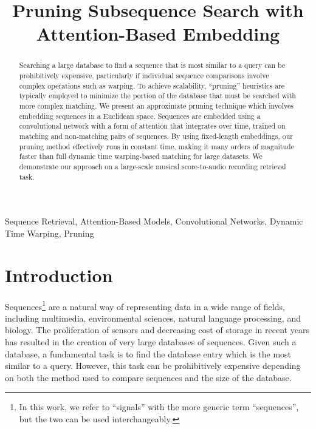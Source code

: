 \documentclass{article}
\title{Pruning Subsequence Search with Attention-Based Embedding}
\begin{document}
\ninept
\maketitle

\begin{abstract}
Searching a large database to find a sequence that is most similar to a query can be prohibitively expensive, particularly if individual sequence comparisons involve complex operations such as warping. 
To achieve scalability, ``pruning'' heuristics are typically employed to minimize the portion of the database that must be searched with more complex matching. 
We present an approximate pruning technique which involves embedding sequences in a Euclidean space.
Sequences are embedded using a convolutional network with a form of attention that integrates over time, trained on matching and non-matching pairs of sequences.
By using fixed-length embeddings, our pruning method effectively runs in constant time, making it many orders of magnitude faster than full dynamic time warping-based matching for large datasets.
We demonstrate our approach on a large-scale musical score-to-audio recording retrieval task.
\end{abstract}

\begin{keywords}
Sequence Retrieval, Attention-Based Models, Convolutional Networks, Dynamic Time Warping, Pruning
\end{keywords}

\section{Introduction}
\label{sec:intro}

Sequences\footnote{In this work, we refer to ``signals'' with the more generic term ``sequences'', but the two can be used interchangeably.} are a natural way of representing data in a wide range of fields, including multimedia, environmental sciences, natural language processing, and biology.
The proliferation of sensors and decreasing cost of storage in recent years has resulted in the creation of very large databases of sequences.
Given such a database, a fundamental task is to find the database entry which is the most similar to a query.
However, this task can be prohibitively expensive depending on both the method used to compare sequences and the size of the database.
\end{document}
